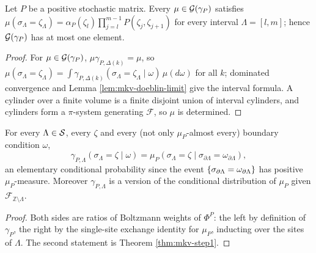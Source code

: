 \begin{theorem}
    \label{thm:mkv-uniqueness}
    \leanok

    Let $P$ be a positive stochastic matrix. Every $\mu \in \mathcal{G}(\gamma_P)$ satisfies
    $\mu(\sigma_\Lambda = \zeta_\Lambda) = \alpha_P(\zeta_l)\prod_{j=l}^{m-1}
    P(\zeta_j,\zeta_{j+1})$ for every interval $\Lambda = [l,m]$; hence
    $\mathcal{G}(\gamma_P)$ has at most one element.
\end{theorem}
\begin{proof}
    \leanok

    For $\mu \in \mathcal{G}(\gamma_P)$, $\mu\gamma_{P,\Delta(k)} = \mu$, so
    $\mu(\sigma_\Lambda = \zeta_\Lambda) = \int \gamma_{P,\Delta(k)}(\sigma_\Lambda =
    \zeta_\Lambda\mid\omega)\,\mu(d\omega)$ for all $k$; dominated convergence and Lemma
    \ref{lem:mkv-doeblin-limit} give the interval formula. A cylinder over a finite volume is a
    finite disjoint union of interval cylinders, and cylinders form a $\pi$-system generating
    $\mathcal{F}$, so $\mu$ is determined.
\end{proof}

\begin{theorem}[Georgii (3.6)]
    \label{thm:mkv-36}
    \leanok

    For every $\Lambda \in \mathcal{S}$, every $\zeta$ and every (not only $\mu_P$-almost every)
    boundary condition $\omega$,
    \[\gamma_{P,\Lambda}(\sigma_\Lambda = \zeta \mid \omega) =
      \mu_P(\sigma_\Lambda = \zeta \mid \sigma_{\partial\Lambda} = \omega_{\partial\Lambda}),\]
    an elementary conditional probability since the event
    $\left\{ \sigma_{\partial\Lambda} = \omega_{\partial\Lambda} \right\}$ has positive $\mu_P$-measure.
    Moreover $\gamma_{P,\Lambda}$ is a version of the conditional distribution of $\mu_P$ given
    $\mathcal{F}_{\mathbb{Z}\setminus\Lambda}$.
\end{theorem}
\begin{proof}
    \leanok

    Both sides are ratios of Boltzmann weights of $\Phi^P$: the left by definition of
    $\gamma_P$, the right by the single-site exchange identity for $\mu_P$, inducting over the
    sites of $\Lambda$. The second statement is Theorem \ref{thm:mkv-step1}.
\end{proof}

